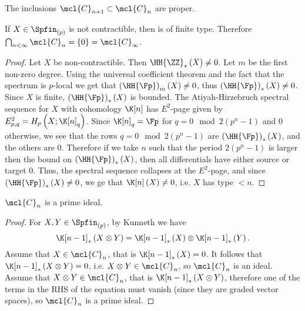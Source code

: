 \begin{proposition}
	The inclusions $\mcl{C}_{n+1} \subset \mcl{C}_n$ are proper.
\end{proposition}

\begin{proposition}
	If $X \in \Spfin_{\left(p\right)}$ is not contractible, then is of finite type.
	Therefore $\bigcap_{n < \infty} \mcl{C}_n = \left\{0\right\} = \mcl{C}_\infty$.
\end{proposition}

\begin{proof}
	Let $X$ be non-contractible.
	Then $\HH{\ZZ}_*\left(X\right) \neq 0$.
	Let $m$ be the first non-zero degree.
	Using the universal coefficient theorem and the fact that the spectrum is $p$-local we get that $\left(\HH{\Fp}\right)_m\left(X\right) \neq 0$, thus $\left(\HH{\Fp}\right)_*\left(X\right) \neq 0$.
	Since $X$ is finite, $\left(\HH{\Fp}\right)_*\left(X\right)$ is bounded.
	The Atiyah-Hirzebruch spectral sequence for $X$ with cohomology $\K[n]$ has $E^2$-page given by
	$
	E_{p,q}^2
	= 
	H_p\left(X; \K[n]_q\right)
	$.
	Since $\K[n]_q = \Fp$ for $q = 0 \mod 2\left(p^n-1\right)$ and $0$ otherwise,
	we see that the rows $q = 0 \mod 2\left(p^n-1\right)$ are $\left(\HH{\Fp}\right)_*\left(X\right)$, and the others are $0$.
	Therefore if we take $n$ such that the period $2\left(p^n-1\right)$ is larger then the bound on $\left(\HH{\Fp}\right)_*\left(X\right)$, then all differentials have either source or target $0$.
	Thus, the spectral sequence collapses at the $E^2$-page, and since $\left(\HH{\Fp}\right)_*\left(X\right) \neq 0$, we ge that $\K[n]\left(X\right) \neq 0$, i.e. $X$ has type $<n$.
\end{proof}

\begin{proposition}
	$\mcl{C}_n$ is a prime ideal.
\end{proposition}

\begin{proof}
	For $X,Y \in \Spfin_{\left(p\right)}$, by Kunneth we have 
	$$
	\K[n-1]_*\left(X \otimes  Y\right)
	= \K[n-1]_*\left(X\right) \otimes \K[n-1]_*\left(Y\right).
	$$
	Assume that $X \in \mcl{C}_n$, that is $\K[n-1]_*\left(X\right) = 0$.
	It follows that $\K[n-1]_*\left(X \otimes  Y\right) = 0$, i.e. $X \otimes Y \in \mcl{C}_n$, so $\mcl{C}_n$ is an ideal.
	Assume that $X \otimes Y\in \mcl{C}_n$, that is $\K[n-1]_*\left(X \otimes  Y\right)$, therefore one of the terms in the RHS of the equation must vanish (since they are graded vector spaces), so $\mcl{C}_n$ is a prime ideal.
\end{proof}

